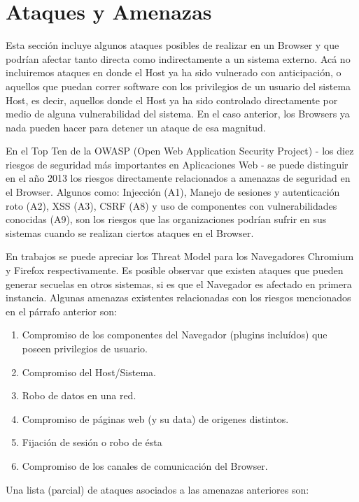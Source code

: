 \section{Ataques y Amenazas}
Esta sección incluye algunos ataques posibles de realizar en un Browser y que podrían afectar tanto directa como indirectamente a un sistema externo. Acá no incluiremos ataques en donde el Host ya ha sido vulnerado con anticipación, o aquellos que puedan correr software con los privilegios de un usuario del sistema Host, es decir, aquellos donde el Host ya ha sido controlado directamente por medio de alguna vulnerabilidad del sistema. En el caso anterior, los Browsers ya nada pueden hacer para detener un ataque de esa magnitud.

En el Top Ten \cite{owaspTopTen} de la OWASP (Open Web Application Security Project) - los diez riesgos de seguridad más importantes en Aplicaciones Web - se puede distinguir en el año 2013 los riesgos directamente relacionados a amenazas de seguridad en el Browser. Algunos como: Injección (A1), Manejo de sesiones y autenticación roto (A2), XSS (A3), CSRF (A8) y uso de componentes con vulnerabilidades conocidas (A9), son los riesgos que las organizaciones podrían sufrir en sus sistemas cuando se realizan ciertos ataques en el Browser.

En trabajos \cite{barth2008security, FirefoxThreatModel} se puede apreciar los Threat Model para los Navegadores Chromium y Firefox respectivamente. Es posible observar que existen ataques que pueden generar secuelas en otros sistemas, si es que el Navegador es afectado en primera instancia. Algunas amenazas existentes relacionadas con los riesgos mencionados en el párrafo anterior son:

\begin{enumerate}
	\item Compromiso de los componentes del Navegador (plugins incluídos) que poseen privilegios de usuario.
	\item Compromiso del Host/Sistema.
	\item Robo de datos en una red.
	\item Compromiso de páginas web (y su data) de origenes distintos.
	\item Fijación de sesión o robo de ésta
	\item Compromiso de los canales de comunicación del Browser.
\end{enumerate}

Una lista (parcial) de ataques asociados a las amenazas anteriores son:

